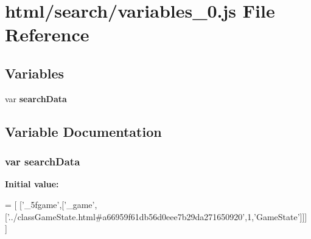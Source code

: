 \section{html/search/variables\-\_\-0.js File Reference}
\label{variables__0_8js}
\subsection*{Variables}
\begin{DoxyCompactItemize}
\item 
var {\bf search\-Data}
\end{DoxyCompactItemize}


\subsection{Variable Documentation}
\subsubsection[{search\-Data}]{\setlength{\rightskip}{0pt plus 5cm}var search\-Data}\label{variables__0_8js_ad01a7523f103d6242ef9b0451861231e}
{\bfseries Initial value\-:}
\begin{DoxyCode}
=
[
  [\textcolor{stringliteral}{'\_5fgame'},[\textcolor{stringliteral}{'\_game'},[\textcolor{stringliteral}{'../classGameState.html#a66959f61db56d0eee7b29da271650920'},1,\textcolor{stringliteral}{'GameState'}]]]
]
\end{DoxyCode}
